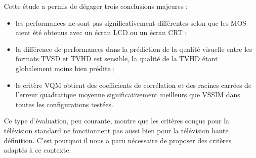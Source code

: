 Cette étude a permis de dégager trois conclusions majeures :
\begin{itemize}
\item les performances ne sont pas significativement différentes selon que les MOS aient été obtenus avec un écran LCD ou un écran CRT ;
\item la différence de performances dans la prédiction de la qualité visuelle entre les formats TVSD et TVHD est sensible, la qualité de la TVHD étant globalement moins bien prédite ;
\item le critère VQM obtient des coefficients de corrélation et des racines carrées de l'erreur quadratique moyenne significativement meilleurs que VSSIM dans toutes les configurations testées.
\end{itemize}

Ce type d'évaluation, peu courante, montre que les critères conçus pour la télévision standard ne fonctionnent pas aussi bien pour la télévision haute définition. C'est pourquoi il nous a paru nécessaire de proposer des critères adaptés à ce contexte. %


\ornementChapitre
